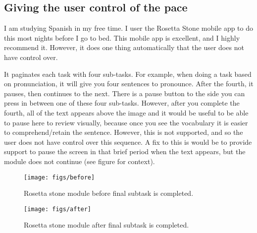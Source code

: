 \subsection{Giving the user control of the pace}
I am studying Spanish in my free time. I user the Rosetta Stone mobile app to do this most nights before I go to bed. This mobile app is excellent, and I highly recommend it. However, it does one thing automatically that the user does not have control over.

It paginates each task with four sub-tasks. For example, when doing a task based on pronunciation, it will give you four sentences to pronounce. After the fourth, it pauses, then continues to the next. There is a pause button to the side you can press in between one of these four sub-tasks. However, after you complete the fourth, all of the text appears above the image and it would be useful to be able to pause here to review visually, because once you see the vocabulary it is easier to comprehend/retain the sentence. However, this is not supported, and so the user does not have control over this sequence. A fix to this is would be to provide support to pause the screen in that brief period when the text appears, but the module does not continue (see figure for context).

\begin{figure}[H]
  \centering
  \texttt{[image: figs/before]}
  \caption{Rosetta stone module before final subtask is completed.}
  \label{fig::1}
\end{figure}

\begin{figure}[H]
  \centering
  \texttt{[image: figs/after]}
  \caption{Rosetta stone module after final subtask is completed.}
  \label{fig::2}
\end{figure}


